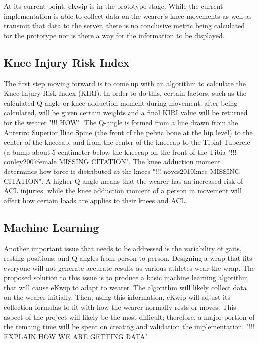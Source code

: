 At its current point, eKwip is in the prototype stage. While the current implementation is able to collect data on the wearer's knee movements as well as transmit that data to the server, there is no conclusive metric being calculated for the prototype nor is there a way for the information to be displayed. 



\subsection {Knee Injury Risk Index}
The first step moving forward is to come up with an algorithm to calculate the Knee Injury Risk Index (KIRI). In order to do this, certain factors, such as the calculated Q-angle or knee adduction moment during movement, after being calculated, will be given certain weights and a final KIRI value will be returned for the wearer "!!! HOW". The Q-angle is formed from a line drawn from the Anteriro Superior Iliac Spine (the front of the pelvic bone at the hip level) to the center of the kneecap, and from the center of the kneecap to the Tibial Tubercle (a bump about 5 centimeter below the kneecap on the front of the Tibia "!!! conley2007female MISSING CITATION". The knee adduction moment determines how force is distributed at the knees "!!! noyes2010knee MISSING CITATION". A higher Q-angle means that the wearer has an increased risk of ACL injuries, while the knee adduction moment of a person in movement will affect how certain loads are applies to their knees and ACL. 

\subsection {Machine Learning}
Another important issue that needs to be addressed is the variability of gaits, resting positions, and Q-angles from person-to-person. Designing a wrap that fits everyone will not generate accurate results as various athletes wear the wrap. The proposed solution to this issue is to produce a basic machine learning algorithm that will cause eKwip to adapt to wearer. The algorithm will likely collect data on the wearer initially. Then, using this information, eKwip will adjust its collection formulas to fit with how the wearer normally rests or moves. This aspect of the project will likely be the most difficult; therefore, a major portion of the remaing time will be spent on creating and validation the implementation. "!!! EXPLAIN HOW WE ARE GETTING DATA"

